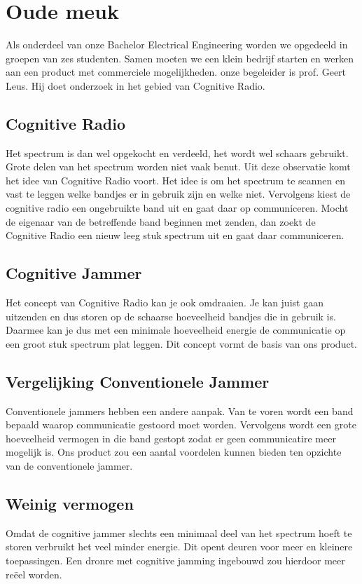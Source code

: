\documentclass[oneside, a4paper, openany]{article}
\begin{document}
\clearpage
\section{Oude meuk}
Als onderdeel van onze Bachelor Electrical Engineering worden we opgedeeld in groepen van zes studenten. Samen moeten we een klein bedrijf starten en werken aan een product met commerciele mogelijkheden. onze begeleider is prof. Geert Leus. Hij doet onderzoek in het gebied van Cognitive Radio.

\subsection{Cognitive Radio}
Het spectrum is dan wel opgekocht en verdeeld, het wordt wel schaars gebruikt. Grote delen van het spectrum worden niet vaak benut. Uit deze observatie komt het idee van Cognitive Radio voort. Het idee is om het spectrum te scannen en vast te leggen welke bandjes er in gebruik zijn en welke niet. Vervolgens kiest de cognitive radio een ongebruikte band uit en gaat daar op communiceren. Mocht de eigenaar van de betreffende band beginnen met zenden, dan zoekt de Cognitive Radio een nieuw leeg stuk spectrum uit en gaat daar communiceren.

\subsection{Cognitive Jammer}
Het concept van Cognitive Radio kan je ook omdraaien. Je kan juist gaan uitzenden en dus storen op de schaarse hoeveelheid bandjes die in gebruik is. Daarmee kan je dus met een minimale hoeveelheid energie de communicatie op een groot stuk spectrum plat leggen. Dit concept vormt de basis van ons product.

\subsection{Vergelijking Conventionele Jammer}
Conventionele jammers hebben een andere aanpak. Van te voren wordt een band bepaald waarop communicatie gestoord moet worden. Vervolgens wordt een grote hoeveelheid vermogen in die band gestopt zodat er geen communicatire meer mogelijk is. Ons product zou een aantal voordelen kunnen bieden ten opzichte van de conventionele jammer.

\subsection{Weinig vermogen}
Omdat de cognitive jammer slechts een minimaal deel van het spectrum hoeft te storen verbruikt het veel minder energie. Dit opent deuren voor meer en kleinere toepassingen. Een dronre met cognitive jamming ingebouwd zou hierdoor meer re\"eel worden.
\end{document}
